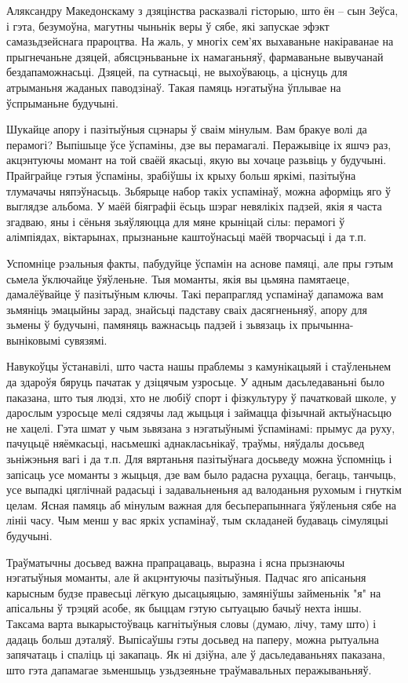 Аляксандру Македонскаму з дзяцінства расказвалі гісторыю, што ён – сын Зеўса, і гэта, безумоўна, магутны чыньнік веры ў сябе, які запускае эфэкт самазьдзейснага прароцтва. На жаль, у многіх сем'ях выхаваньне накіраванае на прыгнечаньне дзяцей, абясцэньваньне іх намаганьняў, фармаваньне вывучанай бездапаможнасьці. Дзяцей, па сутнасьці, не выхоўваюць, а ціснуць для атрыманьня жаданых паводзінаў. Такая памяць нэгатыўна ўплывае на ўспрыманьне будучыні.

Шукайце апору і пазітыўныя сцэнары ў сваім мінулым. Вам бракуе волі да перамогі? Выпішыце ўсе ўспаміны, дзе вы перамагалі. Перажывіце іх яшчэ раз, акцэнтуючы момант на той сваёй якасьці, якую вы хочаце разьвіць у будучыні. Прайграйце гэтыя ўспаміны, зрабіўшы іх крыху больш яркімі, пазітыўна тлумачачы няпэўнасьць. Зьбярыце набор такіх успамінаў, можна аформіць яго ў выглядзе альбома. У маёй біяграфіі ёсьць шэраг невялікіх падзей, якія я часта згадваю, яны і сёньня зьяўляюцца для мяне крыніцай сілы: перамогі ў алімпіядах, віктарынах, прызнаньне каштоўнасьці маёй творчасьці і да т.п.

Успомніце рэальныя факты, пабудуйце ўспамін на аснове памяці, але пры гэтым сьмела ўключайце ўяўленьне. Тыя моманты, якія вы цьмяна памятаеце, дамалёўвайце ў пазітыўным ключы. Такі перапрагляд успамінаў дапаможа вам зьмяніць эмацыйны зарад, знайсьці падставу сваіх дасягненьняў, апору для зьмены ў будучыні, памяняць важнасьць падзей і зьвязаць іх прычынна-выніковымі сувязямі.

Навукоўцы ўстанавілі, што часта нашы праблемы з камунікацыяй і стаўленьнем да здароўя бяруць пачатак у дзіцячым узросьце. У адным дасьледаваньні было паказана, што тыя людзі, хто не любіў спорт і фізкультуру ў пачатковай школе, у дарослым узросьце мелі сядзячы лад жыцьця і займацца фізычнай актыўнасьцю не хацелі. Гэта шмат у чым зьвязана з нэгатыўнымі ўспамінамі: прымус да руху, пачуцьцё няёмкасьці, насьмешкі аднакласьнікаў, траўмы, няўдалы досьвед зьніжэньня вагі і да т.п. Для вяртаньня пазітыўнага досьведу можна ўспомніць і запісаць усе моманты з жыцьця, дзе вам было радасна рухацца, бегаць, танчыць, усе выпадкі цяглічнай радасьці і задавальненьня ад валоданьня рухомым і гнуткім целам. Ясная памяць аб мінулым важная для бесьперапыннага ўяўленьня сябе на лініі часу. Чым менш у вас яркіх успамінаў, тым складаней будаваць сімуляцыі будучыні.

Траўматычны досьвед важна прапрацаваць, выразна і ясна прызнаючы нэгатыўныя моманты, але й акцэнтуючы пазітыўныя. Падчас яго апісаньня карысным будзе правесьці лёгкую дысацыяцыю, замяніўшы займеньнік "я" на апісальны ў трэцяй асобе, як быццам гэтую сытуацыю бачыў нехта іншы. Таксама варта выкарыстоўваць кагнітыўныя словы (думаю, лічу, таму што) і дадаць больш дэталяў. Выпісаўшы гэты досьвед на паперу, можна рытуальна запячатаць і спаліць ці закапаць. Як ні дзіўна, але ў дасьледаваньнях паказана, што гэта дапамагае зьменшыць узьдзеяньне траўмавальных перажываньняў.

